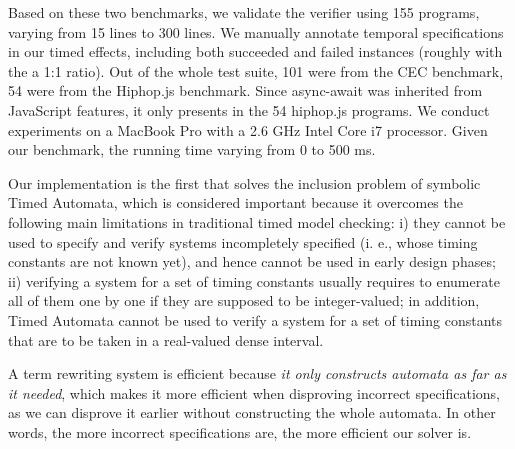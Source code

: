 \documentclass[acmsmall,10pt,review]{acmart}
\begin{document}
{%

   

Based on these two benchmarks, we validate the verifier using 155  programs, varying from 15 lines to 300 lines. We manually annotate temporal specifications in our timed effects, including both succeeded and failed instances (roughly with the a 1:1 ratio). 
Out of the whole test suite, 101 were from the CEC benchmark, 54 were from the Hiphop.js benchmark.  Since async-await was inherited from JavaScript features, it only presents in the 54 hiphop.js programs.
We conduct experiments on a MacBook Pro with a 2.6 GHz Intel Core i7 processor. Given our benchmark, the running time varying from 0 to 500 ms. 


Our implementation is the first that solves the  inclusion problem of symbolic Timed Automata, which is considered important because it overcomes the following main limitations in traditional timed model checking:  i) they cannot be used to specify and verify systems incompletely specified (i. e., whose timing constants are not known yet), and hence cannot be used in early design phases; ii) verifying a system for a set of timing constants usually requires to enumerate all of them one by one if they are supposed to be integer-valued; in addition, Timed Automata cannot be used to verify a system for a set of timing constants that are to be taken in a real-valued dense interval. 



A term rewriting system is efficient because \emph{it only constructs automata as far as it needed}, which makes it more efficient when disproving incorrect specifications, as we can disprove it earlier without constructing the whole automata. In other words, the more incorrect specifications are, the more efficient our solver is.

}
\end{document}
